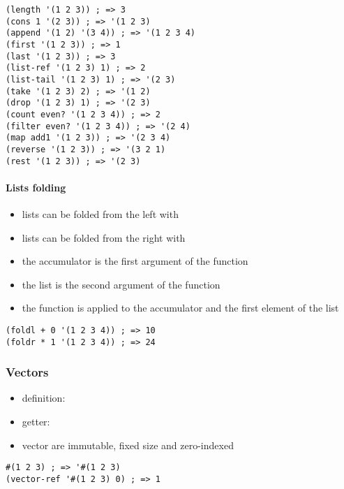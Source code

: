 \documentclass[a4paper,landscape,10pt]{article}
\begin{document}
\begin{multicols*}{2}
  \begin{lstlisting}[language=Racket]
(length '(1 2 3)) ; => 3
(cons 1 '(2 3)) ; => '(1 2 3)
(append '(1 2) '(3 4)) ; => '(1 2 3 4)
(first '(1 2 3)) ; => 1
(last '(1 2 3)) ; => 3
(list-ref '(1 2 3) 1) ; => 2
(list-tail '(1 2 3) 1) ; => '(2 3)
(take '(1 2 3) 2) ; => '(1 2)
(drop '(1 2 3) 1) ; => '(2 3)
(count even? '(1 2 3 4)) ; => 2
(filter even? '(1 2 3 4)) ; => '(2 4)
(map add1 '(1 2 3)) ; => '(2 3 4)
(reverse '(1 2 3)) ; => '(3 2 1)
(rest '(1 2 3)) ; => '(2 3)
\end{lstlisting}

  \paragraph{Lists folding}

  \begin{itemize}
    \item lists can be folded from the left with 
    \item lists can be folded from the right with 
    \item the accumulator is the first argument of the function
    \item the list is the second argument of the function
    \item the function is applied to the accumulator and the first element of the list
  \end{itemize}

  \begin{lstlisting}[language=Racket]
(foldl + 0 '(1 2 3 4)) ; => 10
(foldr * 1 '(1 2 3 4)) ; => 24
  \end{lstlisting}

  \subsubsection{Vectors}

  \begin{itemize}
    \item definition: 
    \item getter: 
    \item vector are immutable, fixed size and zero-indexed
  \end{itemize}

  \begin{lstlisting}[language=Racket]
#(1 2 3) ; => '#(1 2 3)
(vector-ref '#(1 2 3) 0) ; => 1
  \end{lstlisting}


\end{multicols*}
\end{document}

